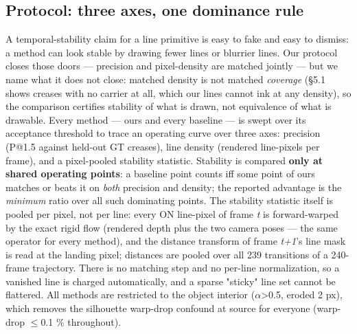 \subsection{Protocol: three axes, one dominance rule}
A temporal-stability claim for a line primitive is easy to fake and easy to dismiss: a
method can look stable by drawing fewer lines or blurrier lines. Our protocol closes
those doors --- precision and pixel-density are matched jointly --- but we name what it does
not close: matched density is not matched \emph{coverage} (\S5.1 shows creases with no carrier
at all, which our lines cannot ink at any density), so the comparison certifies stability
of what is drawn, not equivalence of what is drawable. Every method --- ours and every baseline --- is swept
over its acceptance threshold to trace an operating curve over three axes: precision
(P@1.5 against held-out GT creases), line density (rendered line-pixels per frame), and a
pixel-pooled stability statistic. Stability is compared \textbf{only at shared operating
points}: a baseline point counts iff some point of ours matches or beats it on \emph{both}
precision and density; the reported advantage is the \emph{minimum} ratio over all such
dominating points. The stability statistic itself is pooled per pixel, not per line: every
ON line-pixel of frame \emph{t} is forward-warped by the exact rigid flow (rendered depth plus
the two camera poses --- the same operator for every method), and the distance transform of
frame \emph{t+1}'s line mask is read at the landing pixel; distances are pooled over all 239
transitions of a 240-frame trajectory. There is no matching step and no per-line
normalization, so a vanished line is charged automatically, and a sparse "sticky" line set
cannot be flattered. All methods are restricted to the object interior ($\alpha$>0.5, eroded
2 px), which removes the silhouette warp-drop confound at source for everyone (warp-drop
$\leq$0.1 \% throughout).

